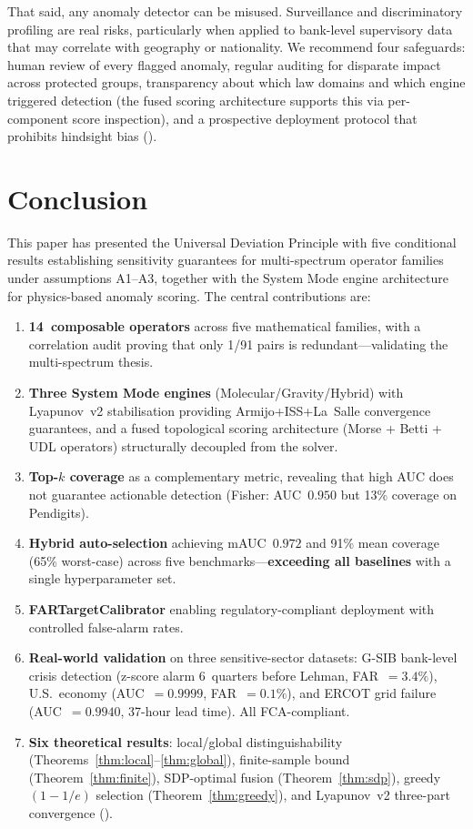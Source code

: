\documentclass{article}
\begin{document}
That said, any anomaly detector can be misused. Surveillance and discriminatory profiling are real risks, particularly when applied to bank-level supervisory data that may correlate with geography or nationality. We recommend four safeguards: human review of every flagged anomaly, regular auditing for disparate impact across protected groups, transparency about which law domains and which engine triggered detection (the fused scoring architecture supports this via per-component score inspection), and a prospective deployment protocol that prohibits hindsight bias ().

\section{Conclusion}

This paper has presented the Universal Deviation Principle with five conditional results establishing sensitivity guarantees for multi-spectrum operator families under assumptions A1--A3, together with the System Mode engine architecture for physics-based anomaly scoring. The central contributions are:

\begin{enumerate}[leftmargin=*]
  \item \textbf{14~composable operators} across five mathematical families, with a correlation audit proving that only 1/91 pairs is redundant---validating the multi-spectrum thesis.
  \item \textbf{Three System Mode engines} (Molecular/Gravity/Hybrid) with Lyapunov~v2 stabilisation providing Armijo+ISS+La~Salle convergence guarantees, and a fused topological scoring architecture (Morse + Betti + UDL operators) structurally decoupled from the solver.
  \item \textbf{Top-$k$ coverage} as a complementary metric, revealing that high AUC does not guarantee actionable detection (Fisher: AUC~$0.950$ but 13\% coverage on Pendigits).
  \item \textbf{Hybrid auto-selection} achieving mAUC~$0.972$ and 91\% mean coverage (65\% worst-case) across five benchmarks---\textbf{exceeding all baselines} with a single hyperparameter set.
  \item \textbf{FARTargetCalibrator} enabling regulatory-compliant deployment with controlled false-alarm rates.
  \item \textbf{Real-world validation} on three sensitive-sector datasets: G-SIB bank-level crisis detection (z-score alarm 6~quarters before Lehman, FAR~$= 3.4\%$), U.S.\ economy (AUC~$= 0.9999$, FAR~$= 0.1\%$), and ERCOT grid failure (AUC~$= 0.9940$, 37-hour lead time). All FCA-compliant.
  \item \textbf{Six theoretical results}: local/global distinguishability (Theorems~\ref{thm:local}--\ref{thm:global}), finite-sample bound (Theorem~\ref{thm:finite}), SDP-optimal fusion (Theorem~\ref{thm:sdp}), greedy $(1{-}1/e)$ selection (Theorem~\ref{thm:greedy}), and Lyapunov~v2 three-part convergence ().
\end{enumerate}
\end{document}
